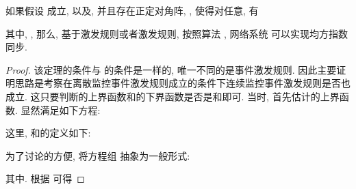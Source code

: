         \begin{thm}\label{thm:qn}
            如果假设  成立, 以及, 并且存在正定对角阵, , 使得对任意, 有
            \begin{comment}
            \bar{\delta}P(u)\otimes G-c\theta\underline{\alpha} P(u)L(u)\otimes G\Gamma
            -c\tau\underline{\alpha} P(u)D(u)\otimes G\Gamma+\frac{1}{2}\sum_{v=1}^{m}q_{uv}P(v)\otimes G\leq 0,
            \end{comment}
            其中, ,
            那么, 基于激发规则或者激发规则, 按照算法 , 网络系统  可以实现均方指数同步.
        \end{thm}
        \begin{proof}
        该定理的条件与 的条件是一样的, 唯一不同的是事件激发规则. 因此主要证明思路是考察在离散监控事件激发规则成立的条件下连续监控事件激发规则是否也成立. 这只要判断的上界函数和的下界函数是否是和即可. 当时, 首先估计的上界函数. 显然满足如下方程:
            \begin{comment}\label{sys:discrete}
                \bigg\{\begin{array}{c}
                    \dot{x}_i(t)=f(x_i(t))+z_i(r_t,t^i_k), \quad    \\
                    \dot{x}_j(t)=f(x_j(t))+z_j(r_t,t^j_{k_j(t)}),
                \end{array}\\
            \end{comment}
       这里,
       和的定义如下:
        \begin{comment}\label{zi}
        \nonumber z_\iota(r_t,t^\iota_k)&=-\theta(t)\rho(t)\sum^N_{j=1}l_{\iota j}(r_{t})\Gamma[h(x_{j}(t_{k}^{\iota}))-h(x_{\iota }(t_{k}^{\iota}))]\\
        &\quad-\tau\rho(t)d_{\iota}(r_{t})\Gamma[h(x_{\iota}(t_{k}^{\iota}))-h(s(t_{k}^{\iota}))].
        \end{comment}
        为了讨论的方便, 将方程组  抽象为一般形式:
            \begin{comment}\label{sys:dis-gener}
                \bigg\{\begin{array}{c}
                    \dot{u}=f(u)+\xi,   \\
                    \dot{v}=f(v)+\zeta,
                \end{array}
            \end{comment}
       其中.
        根据 可得
            \begin{comment}\label{equ:12}
            \nonumber&\quad\|(h(u)-h(u_0))-(h(v)-h(v_0))\|^2\\

\end{comment}
\end{proof}
